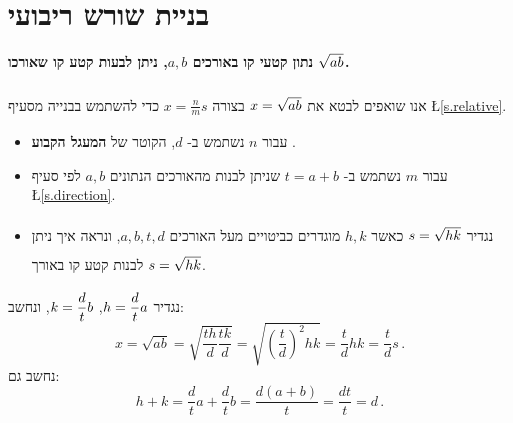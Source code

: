 \section{%
בניית שורש ריבועי%
}\label{s.root}

\textbf{%
נתון קטעי קו באורכים
$a,b$,
ניתן לבעות קטע קו שאורכו
$\rule[-5pt]{0pt}{10pt}\sqrt{ab}$.}

אנו שואפים לבטא את
$\rule[-5pt]{0pt}{20pt}x=\sqrt{ab}$
בצורה
$x=\frac{n}{m}s$
כדי להשתמש בבנייה מסעיף
\L{\ref{s.relative}}.
\vspace*{-8pt}
\begin{itemize}
\item עבור
$n$
נשתמש ב-%
$d$,
הקוטר של
\textbf{%
המעגל הקבוע%
}.
\item עבור
$m$
נשתמש ב-%
$t=a+b$
שניתן לבנות מהאורכים הנתונים
$a,b$
לפי סעיף
\L{\ref{s.direction}}.
\item 
נגדיר
$\rule[-5pt]{0pt}{20pt}s=\sqrt{hk}$
כאשר 
$h,k$
מוגדרים כביטויים מעל האורכים
$a,b,t,d$,
ונראה איך ניתן לבנות קטע קו באורך 
$\rule[-5pt]{0pt}{20pt}s=\sqrt{hk}$.
\end{itemize}
נגדיר
$h=\displaystyle\frac{d}{t}a$, $k=\displaystyle\frac{d}{t}b$,
ונחשב:
\[
x=\sqrt{ab}=\sqrt{\frac{th}{d}\frac{tk}{d}}=\sqrt{\left(\frac{t}{d}\right)^2hk}=\frac{t}{d}hk=\frac{t}{d}s\,.
\]
נחשב גם: 
\[
h+k = \frac{d}{t}a + \frac{d}{t}b = \frac{d(a+b)}{t} = \frac{dt}{t} = d\,.
\]

